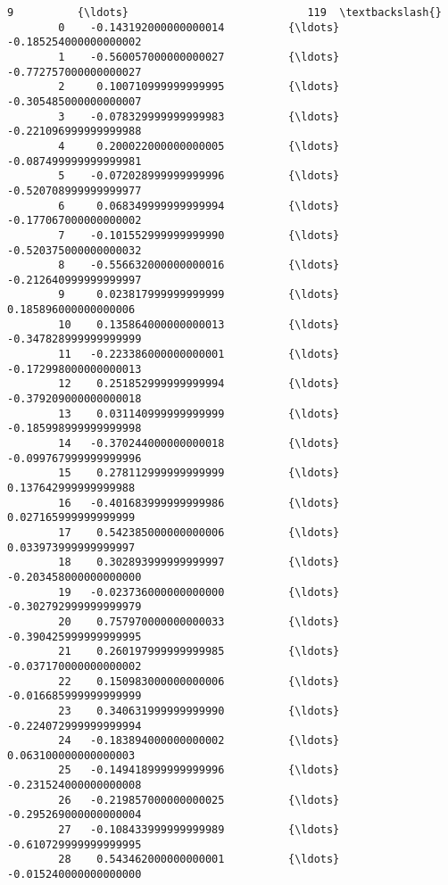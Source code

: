 \documentclass[11pt]{article}
\begin{document}
\begin{Verbatim}[commandchars=\\\{\}]
                                 9          {\ldots}                            119  \textbackslash{}
        0    -0.143192000000000014          {\ldots}          -0.185254000000000002   
        1    -0.560057000000000027          {\ldots}          -0.772757000000000027   
        2     0.100710999999999995          {\ldots}          -0.305485000000000007   
        3    -0.078329999999999983          {\ldots}          -0.221096999999999988   
        4     0.200022000000000005          {\ldots}          -0.087499999999999981   
        5    -0.072028999999999996          {\ldots}          -0.520708999999999977   
        6     0.068349999999999994          {\ldots}          -0.177067000000000002   
        7    -0.101552999999999990          {\ldots}          -0.520375000000000032   
        8    -0.556632000000000016          {\ldots}          -0.212640999999999997   
        9     0.023817999999999999          {\ldots}           0.185896000000000006   
        10    0.135864000000000013          {\ldots}          -0.347828999999999999   
        11   -0.223386000000000001          {\ldots}          -0.172998000000000013   
        12    0.251852999999999994          {\ldots}          -0.379209000000000018   
        13    0.031140999999999999          {\ldots}          -0.185998999999999998   
        14   -0.370244000000000018          {\ldots}          -0.099767999999999996   
        15    0.278112999999999999          {\ldots}           0.137642999999999988   
        16   -0.401683999999999986          {\ldots}           0.027165999999999999   
        17    0.542385000000000006          {\ldots}           0.033973999999999997   
        18    0.302893999999999997          {\ldots}          -0.203458000000000000   
        19   -0.023736000000000000          {\ldots}          -0.302792999999999979   
        20    0.757970000000000033          {\ldots}          -0.390425999999999995   
        21    0.260197999999999985          {\ldots}          -0.037170000000000002   
        22    0.150983000000000006          {\ldots}          -0.016685999999999999   
        23    0.340631999999999990          {\ldots}          -0.224072999999999994   
        24   -0.183894000000000002          {\ldots}           0.063100000000000003   
        25   -0.149418999999999996          {\ldots}          -0.231524000000000008   
        26   -0.219857000000000025          {\ldots}          -0.295269000000000004   
        27   -0.108433999999999989          {\ldots}          -0.610729999999999995   
        28    0.543462000000000001          {\ldots}          -0.015240000000000000   

\end{Verbatim}
\end{document}
